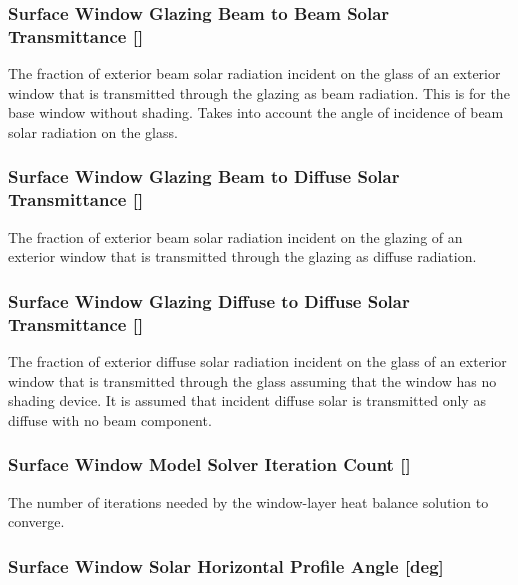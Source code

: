 \subsubsection{Surface Window Glazing Beam to Beam Solar Transmittance {[]}}\label{surface-window-glazing-beam-to-beam-solar-transmittance}

The fraction of exterior beam solar radiation incident on the glass of an exterior window that is transmitted through the glazing as beam radiation. This is for the base window without shading. Takes into account the angle of incidence of beam solar radiation on the glass.

\subsubsection{Surface Window Glazing Beam to Diffuse Solar Transmittance {[]}}\label{surface-window-glazing-beam-to-diffuse-solar-transmittance}

The fraction of exterior beam solar radiation incident on the glazing of an exterior window that is transmitted through the glazing as diffuse radiation.

\subsubsection{Surface Window Glazing Diffuse to Diffuse Solar Transmittance {[]}}\label{surface-window-glazing-diffuse-to-diffuse-solar-transmittance}

The fraction of exterior diffuse solar radiation incident on the glass of an exterior window that is transmitted through the glass assuming that the window has no shading device. It is assumed that incident diffuse solar is transmitted only as diffuse with no beam component.

\subsubsection{Surface Window Model Solver Iteration Count {[]}}\label{surface-window-model-solver-iteration-count}

The number of iterations needed by the window-layer heat balance solution to converge.

\subsubsection{Surface Window Solar Horizontal Profile Angle {[}deg{]}}\label{surface-window-solar-horizontal-profile-angle-deg}

